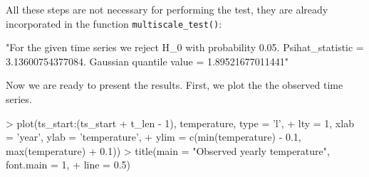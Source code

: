 \documentclass[a4paper]{article}
\begin{document}

All these steps are not necessary for performing the test, they are already incorporated in the function \verb|multiscale_test()|:

\begin{Schunk}
\begin{Soutput}
[1] "For the given time series we reject H_0 with probability 0.05. Psihat_statistic = 3.13600754377084. Gaussian quantile value = 1.89521677011441"
\end{Soutput}
\end{Schunk}

Now we are ready to present the results. First, we plot the the observed time series.

\begin{Schunk}
\begin{Sinput}
> plot(ts_start:(ts_start + t_len - 1), temperature, type = 'l',
+      lty = 1, xlab = 'year', ylab = 'temperature',
+      ylim = c(min(temperature) - 0.1, max(temperature) + 0.1))
> title(main = "Observed yearly temperature", font.main = 1,
+       line = 0.5)
\end{Sinput}
\end{Schunk}
\end{document}

